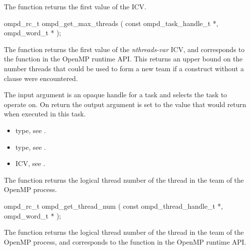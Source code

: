 \label{ompd:ompd_get_max_threads}
\summary
The  function returns the first value of the  ICV.

\format
\cspecificstart
\begin{boxedcode}
ompd\_rc\_t ompd\_get\_max\_threads (
  const ompd\_task\_handle\_t  *,
  ompd\_word\_t              * 
); 
\end{boxedcode}
\cspecificend

\descr
The  function returns the first value of the
 \emph{nthreads-var} ICV,
and corresponds to the  function
in the OpenMP runtime API.
This returns an upper bound on the number threads that could be used
to form a new team if a  construct without a
 clause were encountered.

\argdesc
The input argument  is an opaque handle for a task and selects the task to operate on.
On return the output argument  is set to the value that  would return when
executed in this task.

\crossreferences
\begin{itemize}
	\item {} type, see .
	\item {} type, see .
	\item {} ICV, see .
\end{itemize}

\label{ompd:ompd_get_thread_num}
\summary
The  function returns the logical thread number of the thread in the team of the OpenMP process.

\format
\cspecificstart
\begin{boxedcode}
ompd\_rc\_t ompd\_get\_thread\_num (
  const ompd\_thread\_handle\_t *,
  ompd\_word\_t *
);
\end{boxedcode}
\cspecificend

\descr
The  function returns the logical thread number of the thread in the team of the OpenMP process, and
corresponds to the  function in the OpenMP runtime API.


